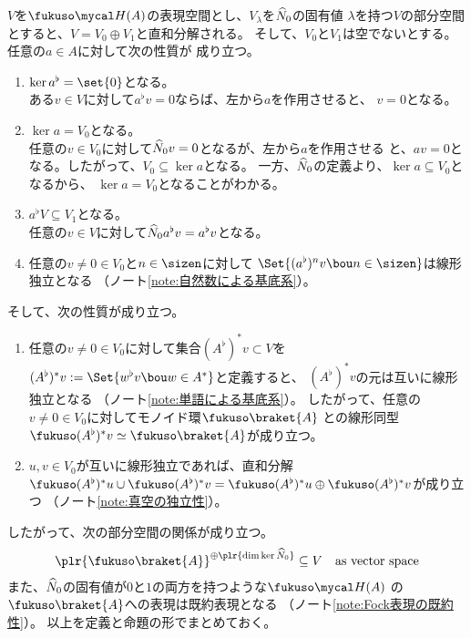 {	$V$を$\fukuso\Eta(A)$の表現空間とし、$V_\lambda$を$\widehat{N}_0$の固有値
	$\lambda$を持つ$V$の部分空間とすると、$V=V_0\oplus V_1$と直和分解される。
	そして、$V_0$と$V_1$は空でないとする。任意の$a\in A$に対して次の性質が
	成り立つ。
	\begin{enumerate}\setlength{\itemsep}{-1mm} %
		\item $\ker a^\flat=\set{0}$となる。\\
		ある$v\in V$に対して$a^\flat v=0$ならば、左から$a$を作用させると、
		$v=0$となる。
		\item $\ker a=V_0$となる。\\
		任意の$v\in V_0$に対して$\widehat{N}_0v=0$となるが、左から$a$を作用させる
		と、$av=0$となる。したがって、$V_0\subseteq \ker a$となる。
		一方、$\widehat{N}_0$の定義より、$\ker a\subseteq V_0$となるから、
		$\ker a=V_0$となることがわかる。
		\item $a^\flat V\subseteq V_1$となる。\\
		任意の$v\in V$に対して$\widehat{N}_0a^\flat v=a^\flat v$となる。
		\item 任意の$v\neq0\in V_0$と$n\in\sizen$に対して
		$\Set{(a^\flat)^nv\bou n\in\sizen}$は線形独立となる
		（ノート\ref{note:自然数による基底系}）。
	\end{enumerate} %
	そして、次の性質が成り立つ。
	\begin{enumerate}\setlength{\itemsep}{-1mm} %
		\item 任意の$v\neq0\in V_0$に対して集合$(A^\flat)^*v\subset V$を
		$(A^\flat)^*v:=\Set{w^\flat v\bou w\in A^*}$と定義すると、
		$(A^\flat)^*v$の元は互いに線形独立となる
		（ノート\ref{note:単語による基底系}）。
		したがって、任意の$v\neq0\in V_0$に対してモノイド環$\fukuso\braket{A}$
		との線形同型$\fukuso(A^\flat)^*v\simeq\fukuso\braket{A}$が成り立つ。
		\item $u,v\in V_0$が互いに線形独立であれば、直和分解
		$\fukuso(A^\flat)^*u\cup\fukuso(A^\flat)^*v
		=\fukuso(A^\flat)^*u\oplus\fukuso(A^\flat)^*v$が成り立つ
		（ノート\ref{note:真空の独立性}）。
	\end{enumerate} %
	したがって、次の部分空間の関係が成り立つ。
	\begin{equation*}\begin{split}
		\plr{\fukuso\braket{A}}^{\oplus\plr{\dim\ker\what{N}_0}} \subseteq V
		\quad\text{as vector space}
	\end{split}\end{equation*}
	また、$\widehat{N}_0$の固有値が$0$と$1$の両方を持つような$\fukuso\Eta(A)$
	の$\fukuso\braket{A}$への表現は既約表現となる
	（ノート\ref{note:Fock表現の既約性}）。
	以上を定義と命題の形でまとめておく。

}
